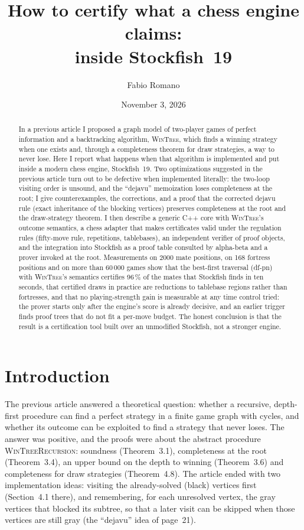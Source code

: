 \documentclass{article}
\title{How to certify what a chess engine claims:\\ \WT{} inside Stockfish~19}
\author{Fabio Romano}
\date{November 3, 2026}
\theoremstyle{plain}
\theoremstyle{definition}
\theoremstyle{remark}
\newcommand{\WT}{\textsc{WinTree}}
\newcommand{\WTR}{\textsc{WinTreeRecursion}}
\begin{document}
\maketitle

\begin{abstract}
In a previous article I proposed a graph model of two-player games of perfect information and a backtracking algorithm, \WT{}, which finds a winning strategy when one exists and, through a completeness theorem for draw strategies, a way to never lose. Here I report what happens when that algorithm is implemented and put inside a modern chess engine, Stockfish~19. Two optimizations suggested in the previous article turn out to be defective when implemented literally: the two-loop visiting order is unsound, and the ``dejavu'' memoization loses completeness at the root; I give counterexamples, the corrections, and a proof that the corrected dejavu rule (exact inheritance of the blocking vertices) preserves completeness at the root and the draw-strategy theorem. I then describe a generic C++ core with \WT{}'s outcome semantics, a chess adapter that makes certificates valid under the regulation rules (fifty-move rule, repetitions, tablebases), an independent verifier of proof objects, and the integration into Stockfish as a proof table consulted by alpha-beta and a prover invoked at the root. Measurements on 2000 mate positions, on 168 fortress positions and on more than 60\,000 games show that the best-first traversal (df-pn) with \WT{}'s semantics certifies 96\,\% of the mates that Stockfish finds in ten seconds, that certified draws in practice are reductions to tablebase regions rather than fortresses, and that no playing-strength gain is measurable at any time control tried: the prover starts only after the engine's score is already decisive, and an earlier trigger finds proof trees that do not fit a per-move budget. The honest conclusion is that the result is a certification tool built over an unmodified Stockfish, not a stronger engine.
\end{abstract}

\section{Introduction}

The previous article \cite{romano2026} answered a theoretical question: whether a recursive, depth-first procedure can find a perfect strategy in a finite game graph with cycles, and whether its outcome can be exploited to find a strategy that never loses. The answer was positive, and the proofs were about the abstract procedure \WTR{}: soundness (Theorem~3.1), completeness at the root (Theorem~3.4), an upper bound on the depth to winning (Theorem~3.6) and completeness for draw strategies (Theorem~4.8). The article ended with two implementation ideas: visiting the already-solved (black) vertices first (Section~4.1 there), and remembering, for each unresolved vertex, the gray vertices that blocked its subtree, so that a later visit can be skipped when those vertices are still gray (the ``dejavu'' idea of page~21).
\end{document}
